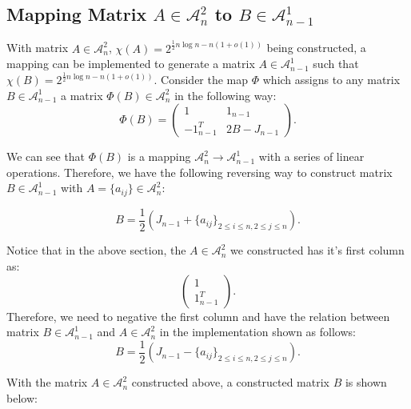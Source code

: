 \documentclass[11pt]{article}
\begin{document}
\subsection{Mapping Matrix $A \in \mathcal{A}_n^2$ to $B \in \mathcal{A}_{n - 1}^1$}
With matrix $A \in \mathcal{A}_n^2$, $\chi(A)=2^{\frac{1}{2}n\log n-n(1+o(1))}$ being constructed, a mapping can be implemented to generate a matrix $A \in \mathcal{A}_{n-1}^{1}$ such that $\chi(B)=2^{\frac{1}{2}n\log n-n(1+o(1))}$. Consider the map $\Phi$ which assigns to any matrix $B \in \mathcal{A}_{n - 1}^1$ a matrix $\Phi(B) \in \mathcal{A}_{n}^2$ in the following way:
$$ \Phi(B) = \left(\begin{array}{cc} 
1 & 1_{n-1}\\
-1^T_{n-1} & 2B-J_{n-1}
\end{array}\right).
$$

We can see that $\Phi(B)$ is a mapping $\mathcal{A}_n^2 \to \mathcal{A}_{n - 1}^1$ with a series of linear operations. Therefore, we have the following reversing way to construct matrix $B \in \mathcal{A}_{n - 1}^1$ with $A=\{a_{ij}\}\in \mathcal{A}_n^2$:

$$B = \frac{1}{2}(J_{n-1}+\{a_{ij}\}_{2\le i\le n, 2\le j\le n}).$$

Notice that in the above section, the $A \in \mathcal{A}_n^2$ we constructed has it's first column as:
$$ \left(\begin{array}{cc} 
1\\
1^T_{n-1}
\end{array}\right).
$$
Therefore,  we need to negative the first column and have the relation between matrix $B \in \mathcal{A}_{n - 1}^1$ and $A \in \mathcal{A}_n^2$ in the implementation shown as follows:    
$$B = \frac{1}{2}(J_{n-1}-\{a_{ij}\}_{2\le i\le n, 2\le j\le n}).$$

With the matrix $A \in \mathcal{A}_n^2$ constructed above, a constructed matrix $B$ is shown below:
\end{document}
